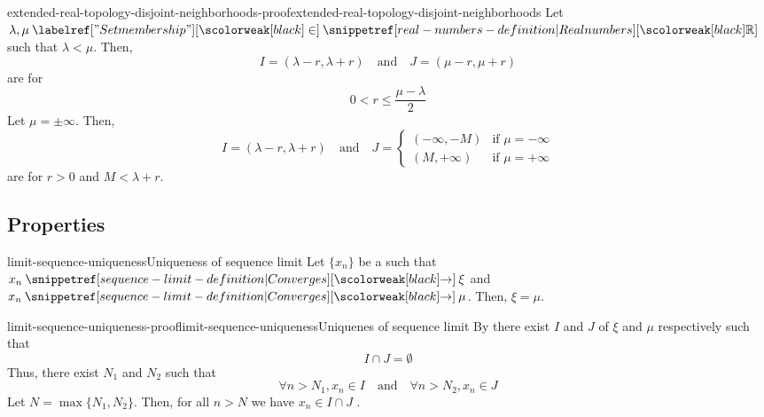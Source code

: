\documentclass[preview]{standalone}
\begin{document}
\begin{snippetproof}{extended-real-topology-disjoint-neighborhoods-proof}{extended-real-topology-disjoint-neighborhoods}{}
    Let \(\lambda, \mu \in \realnumbers\) such that \(\lambda < \mu\).
    Then,
    \[
        I = (\lambda - r, \lambda + r) \quad \text{and} \quad
        J = (\mu - r, \mu + r)
    \]
    are \disjoint for
    \[
        0 < r \leq \frac{\mu - \lambda}{2}
    \]
    Let \(\mu = \pm\infty\). Then,
    \[
        I = (\lambda - r, \lambda + r) \quad \text{and} \quad
        J = \begin{cases}
            (-\infty, -M) & \text{if } \mu = -\infty \\
            (M, +\infty) & \text{if } \mu = +\infty
        \end{cases}
    \]
    are \disjoint for \(r>0\) and \(M < \lambda + r\).
\end{snippetproof}


\subsection{Properties}

\begin{snippetproposition}{limit-sequence-uniqueness}{Uniqueness of sequence limit}
    Let \(\{x_n\}\) be a \sequence such that \(x_n \seqconverges \xi\)
    and \(x_n \seqconverges \mu\).
    Then, \(\xi = \mu\).
\end{snippetproposition}

\begin{snippetproof}{limit-sequence-uniqueness-proof}{limit-sequence-uniqueness}{Uniquenes of sequence limit}
    By  there exist
    \neighborhood[neighborhoods] \(I\) and \(J\) of \(\xi\) and \(\mu\) respectively such that
    \[
        I \cap J = \emptyset
    \]
    Thus, there exist \(N_1\) and \(N_2\) such that
    \[
        \forall n>N_1, x_n \in I \quad \text{and} \quad
        \forall n>N_2, x_n \in J
    \]
    Let \(N = \max\{N_1, N_2\}\). Then, for all \(n>N\) we have
    \(x_n \in I \cap J\) \lightning.
\end{snippetproof}
\end{document}
